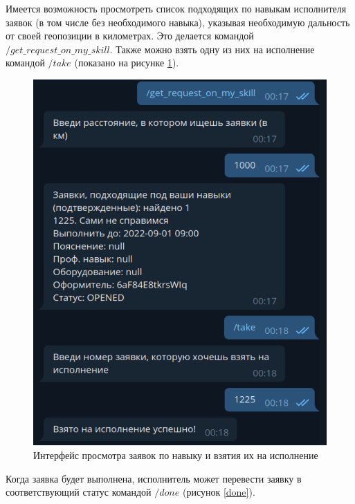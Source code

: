 Имеется возможность просмотреть список подходящих по навыкам исполнителя заявок (в том числе без необходимого навыка), указывая необходимую дальность от своей геопозиции в километрах. Это делается командой $/get\_request\_on\_my\_skill$. Также можно взять одну из них на исполнение командой $/take$ (показано на рисунке \ref{take}).

\begin{figure}[H]
	\begin{center}
		\includegraphics[page=1,scale=0.5]{assets/take.pdf}
	\end{center}
	\caption{Интерфейс просмотра заявок по навыку и взятия их на исполнение}
	\label{take}
\end{figure}

Когда заявка будет выполнена, исполнитель может перевести заявку в соответствующий статус командой $/done$ (рисунок \ref{done}).


